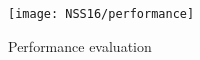  \begin{figure} [t]
 	\centering
 	\texttt{[image: NSS16/performance]}
 	\caption{Performance evaluation}
 	\label{fig:performance-a}
 \end{figure}
